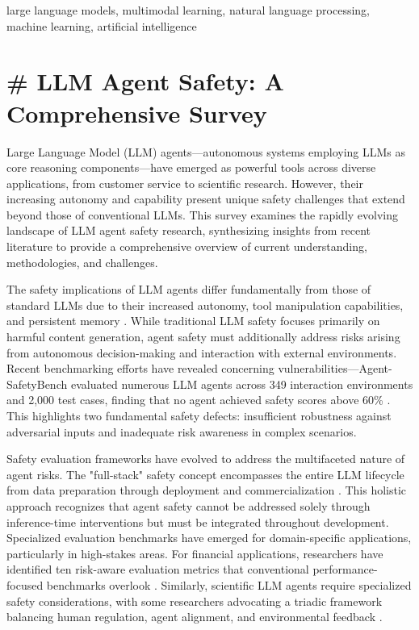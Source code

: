 \documentclass[conference]{IEEEtran}
\begin{document}
\begin{IEEEkeywords}
large language models, multimodal learning, natural language processing, machine learning, artificial intelligence
\end{IEEEkeywords}




\section{# LLM Agent Safety: A Comprehensive Survey}

Large Language Model (LLM) agents—autonomous systems employing LLMs as core reasoning components—have emerged as powerful tools across diverse applications, from customer service to scientific research. However, their increasing autonomy and capability present unique safety challenges that extend beyond those of conventional LLMs. This survey examines the rapidly evolving landscape of LLM agent safety research, synthesizing insights from recent literature to provide a comprehensive overview of current understanding, methodologies, and challenges.

The safety implications of LLM agents differ fundamentally from those of standard LLMs due to their increased autonomy, tool manipulation capabilities, and persistent memory \cite{2412.14470}. While traditional LLM safety focuses primarily on harmful content generation, agent safety must additionally address risks arising from autonomous decision-making and interaction with external environments. Recent benchmarking efforts have revealed concerning vulnerabilities—Agent-SafetyBench evaluated numerous LLM agents across 349 interaction environments and 2,000 test cases, finding that no agent achieved safety scores above 60\% \cite{2412.14470}. This highlights two fundamental safety defects: insufficient robustness against adversarial inputs and inadequate risk awareness in complex scenarios.

Safety evaluation frameworks have evolved to address the multifaceted nature of agent risks. The "full-stack" safety concept encompasses the entire LLM lifecycle from data preparation through deployment and commercialization \cite{2504.15585}. This holistic approach recognizes that agent safety cannot be addressed solely through inference-time interventions but must be integrated throughout development. Specialized evaluation benchmarks have emerged for domain-specific applications, particularly in high-stakes areas. For financial applications, researchers have identified ten risk-aware evaluation metrics that conventional performance-focused benchmarks overlook \cite{2502.15865}. Similarly, scientific LLM agents require specialized safety considerations, with some researchers advocating a triadic framework balancing human regulation, agent alignment, and environmental feedback \cite{2402.04247}.
\end{document}
